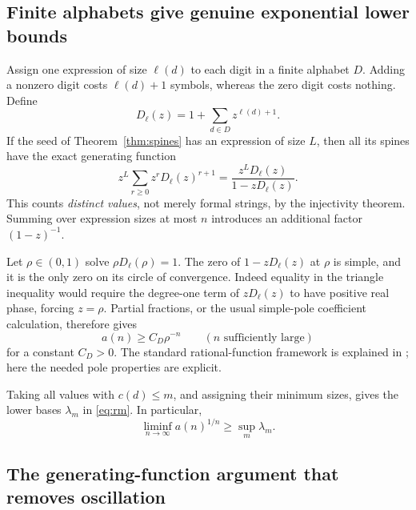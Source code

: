 \documentclass[11pt,letterpaper]{article}
\numberwithin{equation}{section}
\theoremstyle{definition}
\begin{document}
\subsection{Finite alphabets give genuine exponential lower bounds}

Assign one expression of size $\ell(d)$ to each digit in a finite alphabet
$D$. Adding a nonzero digit costs $\ell(d)+1$ symbols, whereas the zero digit
costs nothing. Define
\begin{equation}\label{eq:digitgf}
 D_\ell(z)=1+\sum_{d\in D}z^{\ell(d)+1}.
\end{equation}
If the seed of Theorem~\ref{thm:spines} has an expression of size $L$, then
all its spines have the exact generating function
\begin{equation}\label{eq:spinegf}
 z^L\sum_{r\ge0}z^r D_\ell(z)^{r+1}
   =\frac{z^L D_\ell(z)}{1-zD_\ell(z)}.
\end{equation}
This counts \emph{distinct values}, not merely formal strings, by the
injectivity theorem. Summing over expression sizes at most $n$ introduces
an additional factor $(1-z)^{-1}$.

Let $\rho\in(0,1)$ solve $\rho D_\ell(\rho)=1$.
The zero of $1-zD_\ell(z)$ at $\rho$ is simple, and it is the only zero
on its circle of convergence. Indeed equality in the triangle inequality
would require the degree-one term of $zD_\ell(z)$ to have positive real phase,
forcing $z=\rho$. Partial fractions, or the usual simple-pole coefficient
calculation, therefore gives
\begin{equation}\label{eq:finitealphabetlower}
 a(n)\ge C_D\rho^{-n}\qquad(n\text{ sufficiently large})
\end{equation}
for a constant $C_D>0$. The standard rational-function framework is explained
in \cite[Chapters IV--V]{fs}; here the needed pole properties are explicit.

Taking all values with $c(d)\le m$, and assigning their minimum sizes,
gives the lower bases $\lambda_m$ in \eqref{eq:rm}.
In particular,
\begin{equation}\label{eq:liminflambda}
 \liminf_{n\to\infty}a(n)^{1/n}\ge \sup_m\lambda_m.
\end{equation}

\subsection{The generating-function argument that removes oscillation}
\end{document}
